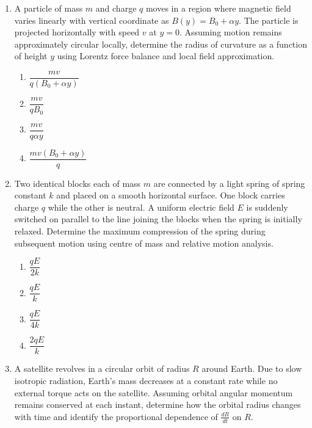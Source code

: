 \documentclass[12pt]{article}
\begin{document}
\begin{enumerate}
\item
A particle of mass $m$ and charge $q$ moves in a region where magnetic field varies linearly with vertical coordinate as $B(y)=B_0+\alpha y$. The particle is projected horizontally with speed $v$ at $y=0$. Assuming motion remains approximately circular locally, determine the radius of curvature as a function of height $y$ using Lorentz force balance and local field approximation.

\begin{enumerate}[label=\Alph*)]
\item $\dfrac{mv}{q(B_0+\alpha y)}$
\item $\dfrac{mv}{qB_0}$
\item $\dfrac{mv}{q\alpha y}$
\item $\dfrac{mv(B_0+\alpha y)}{q}$
\end{enumerate}



\item
Two identical blocks each of mass $m$ are connected by a light spring of spring constant $k$ and placed on a smooth horizontal surface. One block carries charge $q$ while the other is neutral. A uniform electric field $E$ is suddenly switched on parallel to the line joining the blocks when the spring is initially relaxed. Determine the maximum compression of the spring during subsequent motion using centre of mass and relative motion analysis.

\begin{enumerate}[label=\Alph*)]
\item $\dfrac{qE}{2k}$
\item $\dfrac{qE}{k}$
\item $\dfrac{qE}{4k}$
\item $\dfrac{2qE}{k}$
\end{enumerate}




\item
A satellite revolves in a circular orbit of radius $R$ around Earth. Due to slow isotropic radiation, Earth’s mass decreases at a constant rate while no external torque acts on the satellite. Assuming orbital angular momentum remains conserved at each instant, determine how the orbital radius changes with time and identify the proportional dependence of $\frac{dR}{dt}$ on $R$.


\end{enumerate}
\end{document}

